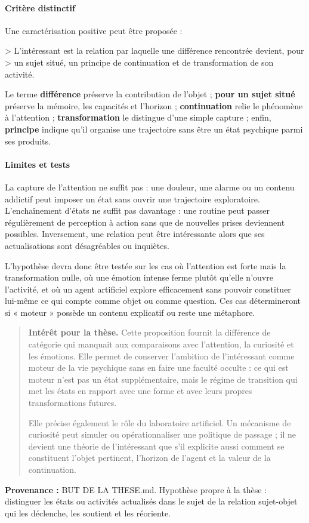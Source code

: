\documentclass[10pt,a4paper]{article}
\begin{document}
\paragraph{Critère distinctif}
Une caractérisation positive peut être proposée :

> L'intéressant est la relation par laquelle une différence rencontrée devient, pour > un sujet situé, un principe de continuation et de transformation de son activité.

Le terme \textbf{différence} préserve la contribution de l'objet ; \textbf{pour un sujet situé} préserve la mémoire, les capacités et l'horizon ; \textbf{continuation} relie le phénomène à l'attention ; \textbf{transformation} le distingue d'une simple capture ; enfin, \textbf{principe} indique qu'il organise une trajectoire sans être un état psychique parmi ses produits.

\paragraph{Limites et tests}
La capture de l'attention ne suffit pas : une douleur, une alarme ou un contenu addictif peut imposer un état sans ouvrir une trajectoire exploratoire. L'enchaînement d'états ne suffit pas davantage : une routine peut passer régulièrement de perception à action sans que de nouvelles prises deviennent possibles. Inversement, une relation peut être intéressante alors que ses actualisations sont désagréables ou inquiètes.

L'hypothèse devra donc être testée sur les cas où l'attention est forte mais la transformation nulle, où une émotion intense ferme plutôt qu'elle n'ouvre l'activité, et où un agent artificiel explore efficacement sans pouvoir constituer lui-même ce qui compte comme objet ou comme question. Ces cas détermineront si « moteur » possède un contenu explicatif ou reste une métaphore.

\begin{quote}
\textbf{Intérêt pour la thèse.} Cette proposition fournit la différence de catégorie qui manquait aux comparaisons avec l'attention, la curiosité et les émotions. Elle permet de conserver l'ambition de l'intéressant comme moteur de la vie psychique sans en faire une faculté occulte : ce qui est moteur n'est pas un état supplémentaire, mais le régime de transition qui met les états en rapport avec une forme et avec leurs propres transformations futures.

Elle précise également le rôle du laboratoire artificiel. Un mécanisme de curiosité peut simuler ou opérationnaliser une politique de passage ; il ne devient une théorie de l'intéressant que s'il explicite aussi comment se constituent l'objet pertinent, l'horizon de l'agent et la valeur de la continuation.
\end{quote}
{\footnotesize\color{metadata}\textbf{Provenance :} BUT DE LA THESE.md. Hypothèse propre à la thèse : distinguer les états ou activités actualisés dans le sujet de la relation sujet-objet qui les déclenche, les soutient et les réoriente.\par}
\end{document}
